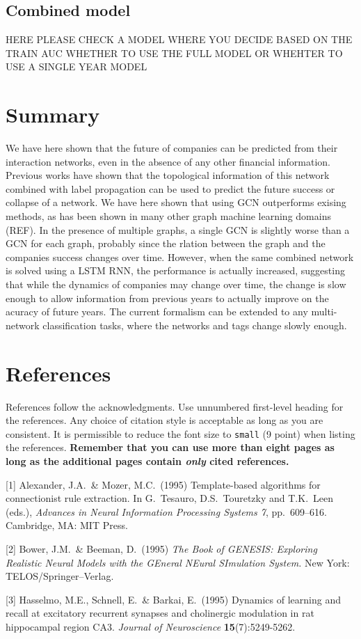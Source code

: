 \subsection{Combined model}
HERE PLEASE CHECK A MODEL WHERE YOU DECIDE BASED ON THE TRAIN AUC WHETHER TO USE THE FULL MODEL OR WHEHTER TO USE A SINGLE YEAR MODEL
\section{Summary}
We have here shown that the future of companies can be predicted from their interaction networks, even in the absence of any other financial information. Previous works have shown that the topological information of this network combined with label propagation can be used to predict the future success or collapse of a network. We have here shown that using GCN outperforms exising methods, as has been shown in many other graph machine learning domains (REF). In the presence of multiple graphs, a single GCN is slightly worse than a GCN for each graph, probably since the rlation between the graph and the companies success changes over time. However, when the same combined network is solved using a LSTM RNN, the performance is actually increased, suggesting that while the dynamics of companies may change over time, the change is slow enough to allow information from previous years to actually improve on the acuracy of future years. The current formalism can be extended to any multi-network classification tasks, where the networks and tags change slowly enough.

\section*{References}

References follow the acknowledgments. Use unnumbered first-level heading for
the references. Any choice of citation style is acceptable as long as you are
consistent. It is permissible to reduce the font size to \verb+small+ (9 point)
when listing the references. {\bf Remember that you can use more than eight
  pages as long as the additional pages contain \emph{only} cited references.}
\medskip

\small

[1] Alexander, J.A.\ \& Mozer, M.C.\ (1995) Template-based algorithms for
connectionist rule extraction. In G.\ Tesauro, D.S.\ Touretzky and T.K.\ Leen
(eds.), {\it Advances in Neural Information Processing Systems 7},
pp.\ 609--616. Cambridge, MA: MIT Press.

[2] Bower, J.M.\ \& Beeman, D.\ (1995) {\it The Book of GENESIS: Exploring
  Realistic Neural Models with the GEneral NEural SImulation System.}  New York:
TELOS/Springer--Verlag.

[3] Hasselmo, M.E., Schnell, E.\ \& Barkai, E.\ (1995) Dynamics of learning and
recall at excitatory recurrent synapses and cholinergic modulation in rat
hippocampal region CA3. {\it Journal of Neuroscience} {\bf 15}(7):5249-5262.
